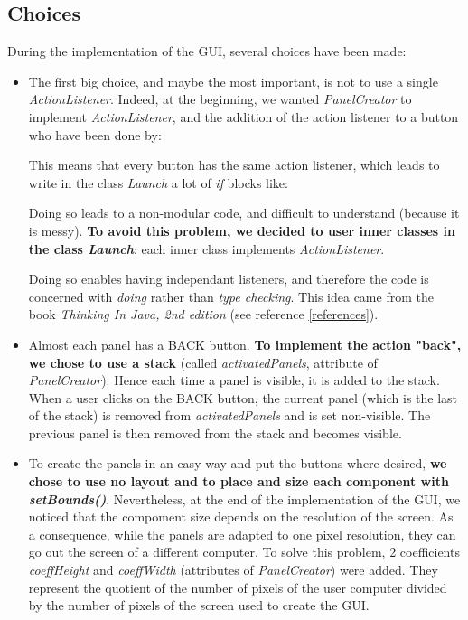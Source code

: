 \subsection{Choices}
\label{sub:choices}
During the implementation of the GUI, several choices have been made:
\begin{itemize}
	\item The first big choice, and maybe the most important, is not to use a single \textit{ActionListener}. Indeed, at the beginning, we wanted \textit{PanelCreator} to implement \textit{ActionListener}, and the addition of the action listener to a button who have been done by:

This means that every button has the same action listener, which leads to write in the class \textit{Launch} a lot of \textit{if} blocks like:

Doing so leads to a non-modular code, and difficult to understand (because it is messy). \textbf{To avoid this problem, we decided to user inner classes in the class \textit{Launch}}: each inner class implements \textit{ActionListener}.

Doing so enables having independant listeners, and therefore the code is concerned with \textit{doing} rather than \textit{type checking}.
This idea came from the book \textit{Thinking In Java, 2nd edition} (see reference \ref{references}).

	\item Almost each panel has a BACK button. \textbf{To implement the action "back", we chose to use a stack} (called \textit{activatedPanels}, attribute of \textit{PanelCreator}). Hence each time a panel is visible, it is added to the stack. When a user clicks on the BACK button, the current panel (which is the last of the stack) is removed from \textit{activatedPanels} and is set non-visible. The previous panel is then removed from the stack and becomes visible.
	
	\item To create the panels in an easy way and put the buttons where desired, \textbf{we chose to use no layout and to place and size each component with \textit{setBounds()}}. Nevertheless, at the end of the implementation of the GUI, we noticed that the compoment size depends on the resolution of the screen. As a consequence, while the panels are adapted to one pixel resolution, they can go out the screen of a different computer. To solve this problem, 2 coefficients \textit{coeffHeight} and \textit{coeffWidth} (attributes of \textit{PanelCreator}) were added. They represent the quotient of the number of pixels of the user computer divided by the number of pixels of the screen used to create the GUI.
	

\end{itemize}
